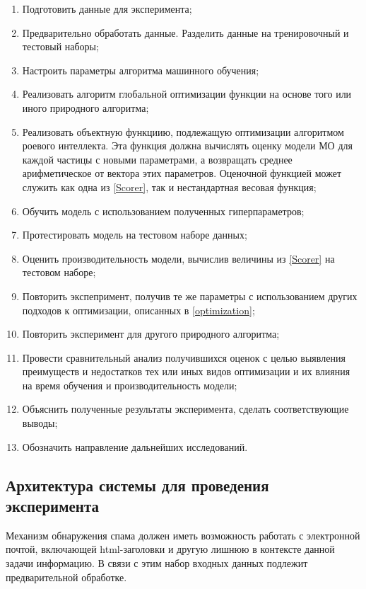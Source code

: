 \begin{enumerate}
      \item Подготовить данные для эксперимента;
      \item Предварительно обработать данные. Разделить данные на тренировочный
            и тестовый наборы;
      \item Настроить параметры алгоритма машинного обучения;
      \item Реализовать алгоритм глобальной оптимизации функции на основе того или иного природного алгоритма;
      \item Реализовать объектную функциию, подлежащую оптимизации алгоритмом роевого интеллекта.
            Эта функция должна вычислять оценку модели МО для каждой частицы с новыми параметрами, а
            возвращать среднее арифметическое от вектора этих параметров.
            Оценочной функцией может служить как одна из \ref{Scorer}, так и
            нестандартная весовая функция;
      \item Обучить модель с использованием полученных гиперпараметров;
      \item Протестировать модель на тестовом наборе данных;
      \item Оценить производительность модели, вычислив величины из \ref{Scorer} на
            тестовом наборе;
      \item Повторить экспепримент, получив те же параметры с использованием
            других подходов к оптимизации, описанных в \ref{optimization};
      \item Повторить эксперимент для другого природного алгоритма;
      \item Провести сравнительный анализ получившихся оценок с целью выявления
            преимуществ и недостатков тех или иных видов оптимизации и их влияния на
            время обучения и производительность модели;
      \item Объяснить полученные результаты эксперимента, сделать соответствующие выводы;
      \item Обозначить направление дальнейших исследований.
\end{enumerate}

\subsection{Архитектура системы для проведения эксперимента}

Механизм обнаружения спама должен иметь возможность работать с электронной почтой,
включающей html-заголовки и другую лишнюю в контексте данной задачи информацию.
В связи с этим набор входных данных подлежит предварительной обработке.

